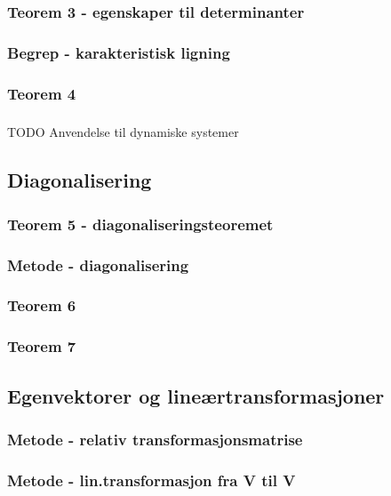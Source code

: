 \documentclass{article}
\begin{document}
      \subsubsection{Teorem 3 - egenskaper til determinanter}
        
      \subsubsection{Begrep - karakteristisk ligning}
        
      \subsubsection{Teorem 4}
        
      \subsubsection{}
        TODO Anvendelse til dynamiske systemer
    \subsection{Diagonalisering}
      \subsubsection{Teorem 5 - diagonaliseringsteoremet}
        
      \subsubsection{Metode - diagonalisering}
        
      \subsubsection{Teorem 6}
        
      \subsubsection{Teorem 7}
        
    \subsection{Egenvektorer og lineærtransformasjoner}
      \subsubsection{Metode - relativ transformasjonsmatrise}
        
      \subsubsection{Metode - lin.transformasjon fra V til V}
        
\end{document}
